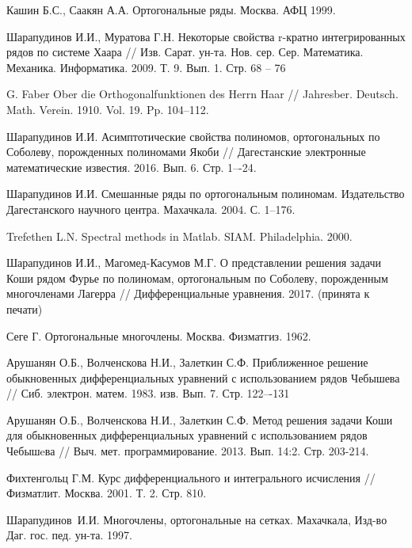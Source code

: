 \begin{thebibliography}{20}
{Кашин Б.С., Саакян А.А.}
Ортогональные ряды. Москва. АФЦ 1999.


{Шарапудинов И.И., Муратова Г.Н.}
Некоторые свойства r-кратно интегрированных рядов по системе Хаара // Изв. Сарат. ун-та. Нов. сер. Сер. Математика. Механика. Информатика. 2009. Т. 9. Вып. 1. Стр. 68 -- 76


{G. Faber}
Ober die Orthogonalfunktionen des Herrn Haar // Jahresber. Deutsch. Math. Verein. 1910. Vol. 19. Pp. 104--112.


{Шарапудинов И.И.}
Асимптотические свойства полиномов, ортогональных по Соболеву, порожденных полиномами Якоби // Дагестанские электронные математические известия. 2016. Вып. 6.	Стр. 1–-24.


{Шарапудинов И.И.}
Смешанные ряды по ортогональным полиномам. Издательство Дагестанского научного центра. Махачкала. 2004. С. 1--176.


{Trefethen L.N.}
Spectral methods in Matlab. SIAM. Philadelphia. 2000.


{Шарапудинов И.И., Магомед-Касумов М.Г.}
О представлении решения задачи Коши  рядом Фурье  по полиномам, ортогональным по  Соболеву, порожденным многочленами Лагерра // Дифференциальные уравнения. 2017. (принята к печати)








Сеге Г. Ортогональные многочлены. Москва. Физматгиз. 1962.


{Арушанян О.Б., Волченскова Н.И., Залеткин С.Ф.}
Приближенное решение обыкновенных дифференциальных уравнений с использованием рядов Чебышева // Сиб. электрон. матем. 1983. изв. Вып. 7. Стр. 122–-131


{Арушанян О.Б., Волченскова Н.И., Залеткин С.Ф.}
Метод решения задачи Коши для обыкновенных дифференциальных уравнений с использованием рядов Чебышeва // Выч. мет. программирование. 2013. Вып. 14:2. Стр. 203-214.


{Фихтенгольц Г.М.}
Курс дифференциального и интегрального исчисления // Физматлит. Москва. 2001. Т. 2. Стр. 810.


{Шарапудинов~И.И.} Многочлены, ортогональные на сетках. Махачкала, Изд-во Даг. гос. пед. ун-та. 1997.		



\end{thebibliography}
